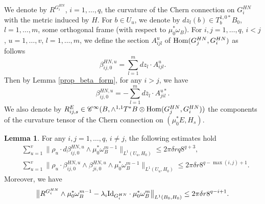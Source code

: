 \documentclass[12pt]{article}
\numberwithin{equation}{section}
\theoremstyle{theorem}
\theoremstyle{definition}
\newtheorem{lem}[thm]{Lemma}
\theoremstyle{remark}
\newcommand{\ccal}{\mathscr{C}}
\begin{document}
	We denote by $R^{G_i^{HN}}$, $i = 1, \ldots, q$, the curvature of the Chern connection on $G_i^{HN}$ with the metric induced by $H$.
	For $b \in U_u$, we denote by $dz_l(b) \in T_b^{1, 0 *} B_0$, $l = 1, \ldots, m$, some orthogonal frame (with respect to $\mu_0^* \omega_B$).
	For $i, j = 1, \ldots, q$, $i < j$, $u = 1, \ldots, v$, $l = 1, \ldots, m$, we define the section $A_{i j l}^u$ of ${\rm{Hom}}(G_j^{HN}, G_i^{HN})$ as follows
	\begin{equation}\label{eq_beta_dec_1}
		\beta_{i j, 0}^{HN, u}
		=
		\sum_{l = 1}^m
		d z_l \cdot A_{i j l}^u.
	\end{equation}
	Then by Lemma \ref{prop_beta_form}, for any $i > j$, we have 
	\begin{equation}\label{eq_beta_dec_2}
		\beta_{i j, 0}^{HN, u}
		=
		- \sum_{l = 1}^m
		d \overline{z}_l \cdot A_{j i l}^{u *}.
	\end{equation}
	We also denote by $R^E_{i j, s} \in \ccal^{\infty}(B, \wedge^{1, 1} T^* B \otimes {\rm{Hom}}(G_j^{HN}, G_i^{HN}))$ the components of the curvature tensor of the Chern connection on $(\mu_0^* E, H_s)$.
	\begin{lem}\label{lem_bnd_off_diag_curv}
		For any $i, j = 1, \ldots, q$, $i \neq j$, the following estimates hold 
		\begin{align}\label{eq_bnd_off_diag_curv}
			&
			\sum_{u = 1}^{v}
			\big\| 
			\rho_u \cdot d \beta_{i j, 0}^{HN, u} \wedge \mu_0^* \omega_B^{m - 1} 
			\big\|_{L^1(U_u, H_0)}
			\leq
			2 \pi \delta r q 8^{q + 3},
			\\
			\label{eq_bnd_off_diag_curv00}
			& 
			\sum_{u = 1}^{v}
			\big\| 
			\rho_u \cdot \beta_{i j, 0}^{HN, u} \wedge \beta_{j i, 0}^{HN, u}  \wedge \mu_0^* \omega_B^{m - 1} 
			\big\|_{L^1(U_u, H_0)}
			\leq
			2 \pi \delta r 8^{q - \max(i, j) + 1}.
		\end{align}
		Moreover, we have
		\begin{equation}\label{eq_bnd_off_diag_curv0}
			\big\| 
			R^{G_i^{HN}}  \wedge \mu_0^* \omega_B^{m - 1} 
			-
			\lambda_i {\rm{Id}}_{G_i^{HN}} \cdot \mu_0^* \omega_B^m 
			\big\|_{L^1(B_0, H_0)}
			\leq
			2 \pi \delta r 8^{q - i + 1}.
		\end{equation}
	\end{lem}
\end{document}
